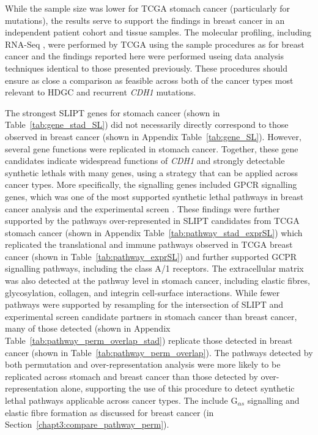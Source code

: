 While the sample size was lower for \gls{TCGA} stomach cancer (particularly for \glspl{mutation}), the results serve to support the findings in breast cancer in an independent patient cohort and tissue samples. The molecular profiling, including \gls{RNA-Seq} , were performed by \gls{TCGA} using the sample procedures as for breast cancer and the findings reported here were performed useing data analysis techniques identical to those presented previously. These procedures should ensure as close a comparison as feasible across both of the cancer types most relevant to \gls{HDGC} and recurrent \textit{CDH1} \glspl{mutation}.

The strongest \gls{SLIPT} genes for stomach cancer (shown in Table~\ref{tab:gene_stad_SL}) did not necessarily directly correspond to those observed in breast cancer (shown in Appendix Table~\ref{tab:gene_SL}). However, several gene functions were replicated in stomach cancer. Together, these gene candidates indicate widespread functions of \textit{CDH1} and strongly detectable \glspl{synthetic lethal} with many genes, using a strategy that can be applied across cancer types. More specifically, the signalling genes included \gls{GPCR} signalling genes, which was one of the most supported \gls{synthetic lethal} \glspl{pathway} in breast cancer analysis and the experimental screen \citep{Telford2015}.%
These findings were further supported by the \glspl{pathway} over-represented in \gls{SLIPT} candidates from \gls{TCGA} stomach cancer (shown in Appendix Table~\ref{tab:pathway_stad_exprSL}) which replicated the translational and immune \glspl{pathway} observed in \gls{TCGA} breast cancer (shown in Table~\ref{tab:pathway_exprSL}) and further supported GCPR signalling \glspl{pathway}, including the class A/1 receptors. The extracellular matrix was also detected at the \gls{pathway} level in stomach cancer, including elastic fibres, glycosylation, collagen, and integrin cell-surface interactions. 
While fewer \glspl{pathway} were supported by resampling for the intersection of \gls{SLIPT} and experimental screen candidate partners in stomach cancer than breast cancer, many of those detected (shown in Appendix Table~\ref{tab:pathway_perm_overlap_stad}) replicate those detected in breast cancer (shown in Table~\ref{tab:pathway_perm_overlap}). The \glspl{pathway} detected by both permutation and over-representation analysis were more likely to be replicated across stomach and breast cancer than those detected by over-representation alone, supporting the use of this procedure to detect \gls{synthetic lethal} \glspl{pathway} applicable across cancer types. The include G$_{\alpha s}$ signalling and elastic fibre formation as discussed for breast cancer (in Section~\ref{chapt3:compare_pathway_perm}).

